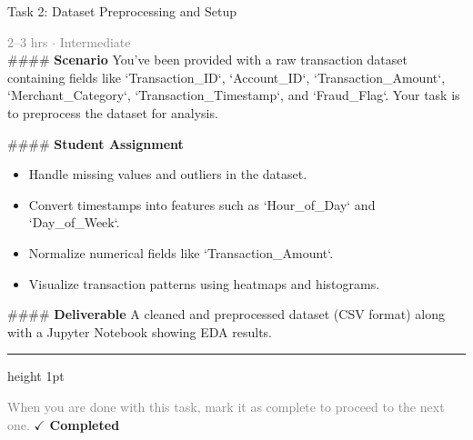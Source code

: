 \documentclass[10pt,a4paper]{article}
\begin{document}
\begin{taskbox}{Task 2: Dataset Preprocessing and Setup}

    {\small \textcolor{gray}{2--3 hrs $\cdot$ Intermediate}}\\[12pt]

    \#\#\#\# \textbf{Scenario}  
You’ve been provided with a raw transaction dataset containing fields like `Transaction\_ID`, `Account\_ID`, `Transaction\_Amount`, `Merchant\_Category`, `Transaction\_Timestamp`, and `Fraud\_Flag`. Your task is to preprocess the dataset for analysis.  

\#\#\#\# \textbf{Student Assignment}  
\begin{itemize}
    \item Handle missing values and outliers in the dataset.  
    \item Convert timestamps into features such as `Hour\_of\_Day` and `Day\_of\_Week`.  
    \item Normalize numerical fields like `Transaction\_Amount`.  
    \item Visualize transaction patterns using heatmaps and histograms.  
\end{itemize}

\#\#\#\# \textbf{Deliverable}  
A cleaned and preprocessed dataset (CSV format) along with a Jupyter Notebook showing EDA results.\par

    \vspace{16pt}

    \textcolor{cardBorder}{\hrule height 1pt}\vspace{8pt}

    \small \textcolor{gray}{When you are done with this task, mark it as complete to proceed to the next one.} \hfill \textbf{\textcolor{brandDark}{$\checkmark$ Completed}}

\end{taskbox}
\end{document}
